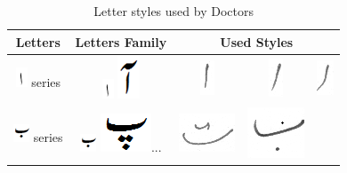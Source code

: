\documentclass[a4paper,conference]{IEEEtran}
\begin{document}
\begin{table}[h]
\centering
\caption{Letter styles used by Doctors}\label{tab6-doc}
\begin{tabular}{@{}ccccc@{}}
\hline
Letters	& Letters Family & \multicolumn{3}{c}{\textbf{Used Styles}} \\ \hline
\includegraphics[scale=0.35]{alif.png} series & \includegraphics[scale=0.35]{alif.png} \includegraphics[scale=0.20]{alif_mad_orig.png} & \includegraphics[scale=0.25]{1.png} &
\includegraphics[scale=0.25]{2.png} &
\includegraphics[scale=0.25]{3.png} \\ 
\hline
\includegraphics[scale=0.35]{Bay.png} series & \includegraphics[scale=0.45]{Bay.png} \includegraphics[scale=0.25]{pay.png}... & \includegraphics[scale=0.20]{4} &
\includegraphics[scale=0.15]{5} &

\end{tabular}
\end{table}
\end{document}
